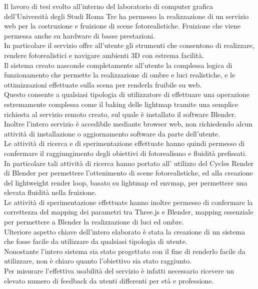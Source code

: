 Il lavoro di tesi svolto all’interno del laboratorio di computer grafica dell’Università degli Studi Roma Tre ha permesso la realizzazione di un servizio web per la costruzione e fruizione di scene fotorealistiche. Fruizione che viene permessa anche su hardware di basse prestazioni.
\\
In particolare il servizio offre all’utente gli strumenti che consentono di realizzare, rendere fotorealistici e navigare ambienti 3D con estrema facilità.
\\
Il sistema creato nasconde completamente all’utente la complessa logica di funzionamento che permette la realizzazione di ombre e luci realistiche, e le ottimizzazioni effettuate sulla scena per renderla fruibile su web. 
\\
Questo consente a qualsiasi tipologia di utilizzatore di effettuare una operazione estremamente complessa come il baking delle lightmap tramite una semplice richiesta al servizio remoto creato, sul quale è installato il software Blender.
\\
Inoltre l’intero servizio è accedibile mediante browser web, non richiedendo alcun attività di installazione o aggiornamento software da parte dell’utente.
\\
Le attività di ricerca e di sperimentazione effettuate hanno quindi permesso di confermare il raggiungimento degli obiettivi di fotorealismo e fluidità prefissati. 
\\
In particolare tali attività di ricerca hanno portato all’ utilizzo del Cycles Render di Blender per permettere l’ottenimento di scene fotorealistiche, ed alla creazione del lightweight render loop, basato su lightmap ed envmap, per permettere una elevata fluidità nella fruizione.
\\
Le attività di sperimentazione effettuate hanno inoltre permesso di confermare la correttezza del mapping dei parametri tra Three.js e Blender, mapping essenziale per permettere a Blender la realizzazione di luci ed ombre.
\\
Ulteriore aspetto chiave dell’intero elaborato è stata la creazione di un sistema che fosse facile da utilizzare da qualsiasi tipologia di utente.
\\
Nonostante l’intero sistema sia stato progettato con il fine di renderlo facile da utilizzare, non è chiaro quanto l’obiettivo sia stato raggiunto.
\\
Per misurare l’effettiva usabilità del servizio è infatti necessario ricevere un elevato numero di feedback da utenti differenti per età e professione.
